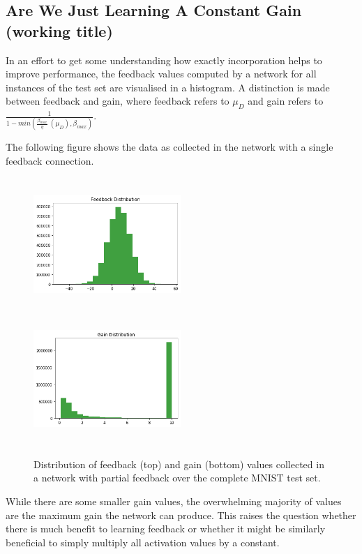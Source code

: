 \documentclass{article}
\begin{document}
 \subsection{Are We Just Learning A Constant Gain (working title)} 
 In an effort to get some understanding how exactly incorporation helps to improve performance, the feedback values computed by a network for all instances of the test set are visualised in a histogram. A distinction is made between feedback and gain, where feedback refers to $\mu_D$ and gain refers to $\frac{1}{1 - min(\frac{\beta_{max}}{\eta} \ (\mu_D), \beta_{max})}$. 
 
 The following figure shows the data as collected in the network with a single feedback connection. 
 
 \begin{figure}[H]
      \centering
      \includegraphics[width=0.5\textwidth,height=5cm,keepaspectratio]{img/constgainpartial.png}
      \includegraphics[width=0.5\textwidth,height=5cm,keepaspectratio]{img/constgainpartialgain.png}

      \caption{Distribution of feedback (top) and gain (bottom) values collected in a network with partial feedback over the complete MNIST test set. }
      \label{fig:partialhists}
  \end{figure}
  
  While there are some smaller gain values, the overwhelming majority of values are the maximum gain the network can produce. This raises the question whether there is much benefit to learning feedback or whether it might be similarly beneficial to simply multiply all activation values by a constant. 
  
\end{document}
